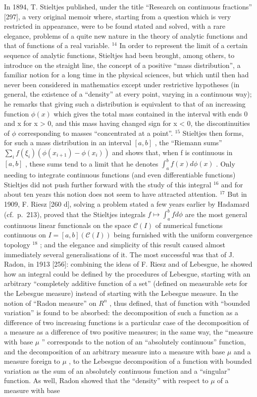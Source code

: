In 1894, T. Stieltjes published, under the title ``Research on continuous fractions'' {[}297{]}, a very original memoir where, starting from a question which is very restricted in appearance, were to be found stated and solved, with a rare elegance, problems of a quite new nature in the theory of analytic functions and that of functions of a real variable. \(^{14}\) In order to represent the limit of a certain sequence of analytic functions, Stieltjes had been brought, among others, to introduce on the straight line, the concept of a positive ``mass distribution'', a familiar notion for a long time in the physical sciences, but which until then had never been considered in mathematics except under restrictive hypotheses (in general, the existence of a ``density'' at every point, varying in a continuous way); he remarks that giving such a distribution is equivalent to that of an increasing function \(\phi(x)\) which gives the total mass contained in the interval with ends 0 and x for x \textgreater{} 0, and this mass having changed sign for x \textless{} 0, the discontinuities of \(\phi\) corresponding to masses ``concentrated at a point''. \(^{15}\) Stieltjes then forms, for such a mass distribution in an interval \([a, b]\) , the ``Riemann sums'' \(\sum_{i} f(\xi_{i})(\phi(x_{i+1}) - \phi(x_{i}))\) and shows that, when f is continuous in \([a, b]\) , these sums tend to a limit that he denotes \(\int_{a}^{b} f(x) d\phi(x)\) . Only needing to integrate continuous functions (and even differentiable functions) Stieltjes did not push further forward with the study of this integral \(^{16}\) and for about ten years this notion does not seem to have attracted attention. \(^{17}\) But in 1909, F. Riesz {[}260 d{]}, solving a problem stated a few years earlier by Hadamard (cf.~p.~213), proved that the Stieltjes integrals \(f \mapsto \int_{a}^{b} fd\phi\) are the most general continuous linear functionals on the space \(\mathcal{C}(I)\) of numerical functions continuous on \(I = [a, b] (\mathcal{C}(I))\) being furnished with the uniform convergence topology \(^{18}\) ; and the elegance and simplicity of this result caused almost immediately several generalisations of it. The most successful was that of J. Radon, in 1913 {[}256{]}: combining the ideas of F. Riesz and of Lebesgue, he showed how an integral could be defined by the procedures of Lebesgue, starting with an arbitrary ``completely additive function of a set'' (defined on measurable sets for the Lebesgue measure) instead of starting with the Lebesgue measure. In the notion of ``Radon measure'' on \(R^{n}\) , thus defined, that of function with ``bounded variation'' is found to be absorbed: the decomposition of such a function as a difference of two increasing functions is a particular case of the decomposition of a measure as a difference of two positive measures; in the same way, the ``measure with base \(\mu\) '' corresponds to the notion of an ``absolutely continuous'' function, and the decomposition of an arbitrary measure into a measure with base \(\mu\) and a measure foreign to \(\mu\) , to the Lebesgue decomposition of a function with bounded variation as the sum of an absolutely continuous function and a ``singular'' function. As well, Radon showed that the ``density'' with respect to \(\mu\) of a measure with base 